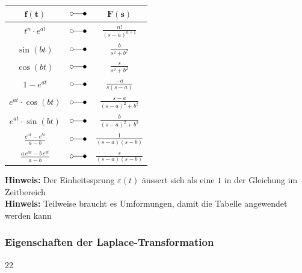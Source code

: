\begin{minipage}[t]{0.48\columnwidth}
    \begin{center}
        \renewcommand{\arraystretch}{1.4}
        \begin{tabular}{c c c}
            \toprule
            $\bm{f(t)}$                             & $\laplace$    & $\bm{F(s)}$                   \\
            \midrule
            $t^n \cdot e^{at}$                      & $\laplace$    & $\frac{n!}{(s-a)^{n+1}}$      \\
            \midrule
            $\sin(bt)$                              & $\laplace$    & $\frac{b}{s^2 + b^2}$         \\
            \midrule
            $\cos(bt)$                              & $\laplace$    & $\frac{s}{s^2 + b^2}$         \\          
            \midrule
            $1 - e^{at}$                            & $\laplace$    & $\frac{-a}{s (s-a)}$          \\
            \midrule
            $e^{at} \cdot \cos(bt)$                 & $\laplace$    & $\frac{s-a}{(s-a)^2 + b^2}$   \\
            \midrule
            $e^{at} \cdot \sin(bt)$                 & $\laplace$    & $\frac{b}{(s-a)^2 + b^2}$     \\
            \midrule
            $\frac{e^{at} - e^{bt}}{a-b}$           & $\laplace$    & $\frac{1}{(s-a)(s-b)}$        \\
            \midrule
            $\frac{a \, e^{at} - b \, e^{bt}}{a-b}$ & $\laplace$    & $\frac{s}{(s-a)(s-b)}$        \\
            \bottomrule
        \end{tabular}
        \renewcommand{\arraystretch}{1}
    \end{center}
\end{minipage}

\vspace{0.2cm}

\textbf{Hinweis:} Der Einheitssprung $\varepsilon(t)$ äussert sich als eine $1$ in der Gleichung im Zeitbereich \\
\textbf{Hinweis:} Teilweise braucht es Umformungen, damit die Tabelle angewendet werden kann


\subsubsection{Eigenschaften der Laplace-Transformation}{22}

